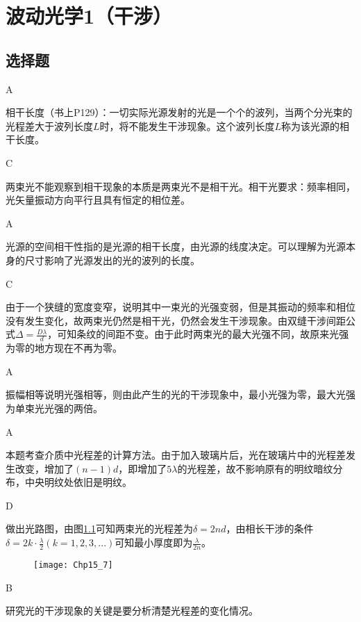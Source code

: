 \chapter{波动光学1（干涉）}
\makeatletter
{}
\makeatother
\section{选择题}
\exercise A

\solve 相干长度（书上P129）：一切实际光源发射的光是一个个的波列，当两个分光束的光程差大于波列长度$L$时，将不能发生干涉现象。这个波列长度$L$称为该光源的相干长度。 

\exercise C

\solve 两束光不能观察到相干现象的本质是两束光不是相干光。相干光要求：频率相同，光矢量振动方向平行且具有恒定的相位差。

\exercise A

\solve 光源的空间相干性指的是光源的相干长度，由光源的线度决定。可以理解为光源本身的尺寸影响了光源发出的光的波列的长度。

\exercise C

\solve 由于一个狭缝的宽度变窄，说明其中一束光的光强变弱，但是其振动的频率和相位没有发生变化，故两束光仍然是相干光，仍然会发生干涉现象。由双缝干涉间距公式$\Delta=\frac{D\lambda}{d}$，可知条纹的间距不变。由于此时两束光的最大光强不同，故原来光强为零的地方现在不再为零。

\exercise A

\solve 振幅相等说明光强相等，则由此产生的光的干涉现象中，最小光强为零，最大光强为单束光光强的两倍。

\exercise A

\solve 本题考查介质中光程差的计算方法。由于加入玻璃片后，光在玻璃片中的光程差发生改变，增加了$(n-1)d$，即增加了$5\lambda$的光程差，故不影响原有的明纹暗纹分布，中央明纹处依旧是明纹。

\exercise D

\solve 做出光路图，由图\ref{fig:15_7}可知两束光的光程差为$\delta=2nd$，由相长干涉的条件$\delta=2k\cdot\frac{\lambda}{2}(k=1,2,3,...)$可知最小厚度即为$\frac{\lambda}{2n}$。
\begin{figure}[!h]
	\centering
	\texttt{[image: Chp15\_7]}
	\caption{}\label{fig:15_7}
\end{figure}

\exercise B

\solve 研究光的干涉现象的关键是要分析清楚光程差的变化情况。

